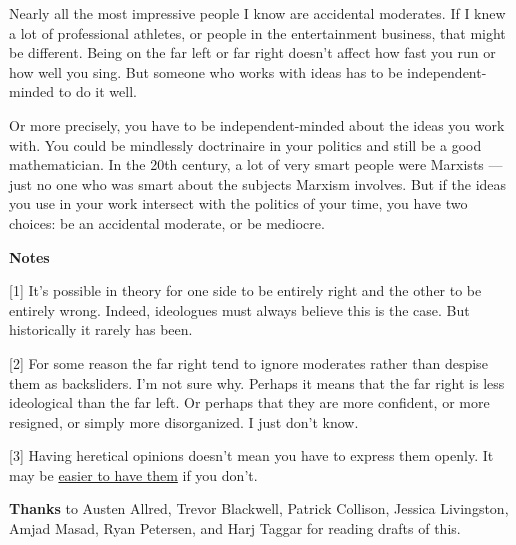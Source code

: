 Nearly all the most impressive people I know are accidental moderates.
If I knew a lot of professional athletes, or people in the entertainment
business, that might be different. Being on the far left or far right
doesn't affect how fast you run or how well you sing. But someone who
works with ideas has to be independent-minded to do it well.

Or more precisely, you have to be independent-minded about the ideas you
work with. You could be mindlessly doctrinaire in your politics and
still be a good mathematician. In the 20th century, a lot of very smart
people were Marxists --- just no one who was smart about the subjects
Marxism involves. But if the ideas you use in your work intersect with
the politics of your time, you have two choices: be an accidental
moderate, or be mediocre.

\textbf{Notes}

{[}1{]} It's possible in theory for one side to be entirely right and
the other to be entirely wrong. Indeed, ideologues must always believe
this is the case. But historically it rarely has been.

{[}2{]} For some reason the far right tend to ignore moderates rather
than despise them as backsliders. I'm not sure why. Perhaps it means
that the far right is less ideological than the far left. Or perhaps
that they are more confident, or more resigned, or simply more
disorganized. I just don't know.

{[}3{]} Having heretical opinions doesn't mean you have to express them
openly. It may be \href{say.html}{easier to have them} if you don't.

\textbf{Thanks} to Austen Allred, Trevor Blackwell, Patrick Collison,
Jessica Livingston, Amjad Masad, Ryan Petersen, and Harj Taggar for
reading drafts of this.
